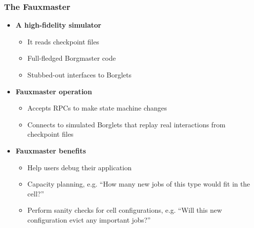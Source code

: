 \begin{frame}
\frametitle{The Fauxmaster}
\begin{itemize}
	\item {\bf A high-fidelity simulator}
	\begin{itemize}
		\item It reads checkpoint files
		\item Full-fledged Borgmaster code
		\item Stubbed-out interfaces to Borglets
	\end{itemize}
	\item {\bf Fauxmaster operation}
	\begin{itemize}
		\item Accepts RPCs to make state machine changes
		\item Connects to simulated Borglets that replay real interactions from checkpoint files
	\end{itemize}
	\item {\bf Fauxmaster benefits}
	\begin{itemize}
		\item Help users debug their application
		\item Capacity planning, e.g. ``How many new jobs of this type would fit in the cell?''
		\item Perform sanity checks for cell configurations, e.g. ``Will this new configuration evict any important jobs?''
	\end{itemize}
\end{itemize}
\end{frame}

